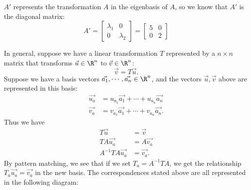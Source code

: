 \begin{enumerate}
{    $A'$ represents the transformation $A$ in the eigenbasis of $A$, so we know that $A'$ is the diagonal matrix:
    $$ A' =
    \begin{bmatrix}
    \lambda_1 & 0 \\
    0 & \lambda_2
    \end{bmatrix} =
    \begin{bmatrix}
    5 & 0 \\
    0 & 2
    \end{bmatrix} $$

  In general, suppose we have a linear transformation $T$ represented by a $n \times n$ matrix that transforms $\vec{u} \in \R^{n}$ to $\vec{v} \in \R^{n}$:
  \[
    \vec{v} = T\vec{u}
  .\]
  Suppose we have a basis vectors $\vec{a_1}, \cdots, \vec{a_n} \in \R^{n}$, and the vectors $\vec{u}, \vec{v}$ above are represented in this basis:
  \[
    \begin{aligned}
      \vec{u_a} &= u_{a_1}\vec{a_1} + \cdots + u_{a_n}\vec{a_n} \\
      \vec{v_a} &= v_{a_1}\vec{a_1} + \cdots + v_{a_n}\vec{a_n}.
    \end{aligned}
  \]
  Thus we have
  \[
    \begin{aligned}
      T\vec{u}          &= \vec{v} \\
      TA\vec{u_a}       &= A\vec{v_a} \\
      A^{-1}TA\vec{u_a} &= \vec{v_a}.
    \end{aligned}
  \]
  By pattern matching, we see that if we set $T_a = A^{-1}TA$, we get the relationship $T_a\vec{u_a} = \vec{v_a}$ in the new basis.
  The correspondences stated above are all represented in the following diagram:

  \begin{figure}[H]
    \centering
  \end{figure}
}




\end{enumerate}
